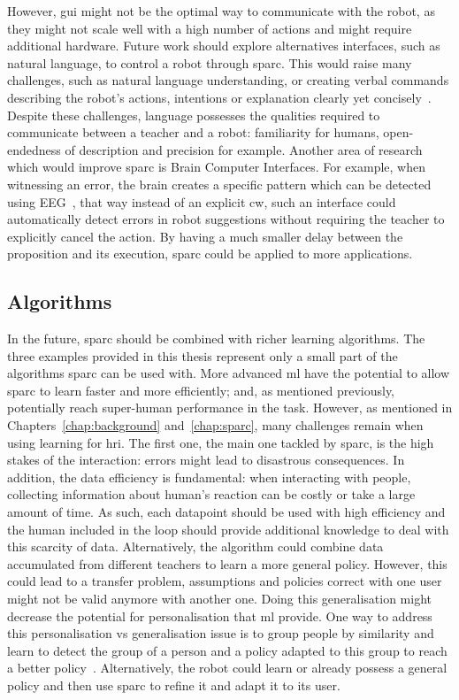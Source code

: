 However, \gls{gui} might not be the optimal way to communicate with the robot, as they might not scale well with a high number of actions and might require additional hardware. Future work should explore alternatives interfaces, such as natural language, to control a robot through \gls{sparc}. This would raise many challenges, such as natural language understanding, or creating verbal commands describing the robot's actions, intentions or explanation clearly yet concisely~\citep{hayes2017improving}. Despite these challenges, language possesses the qualities required to communicate between a teacher and a robot: familiarity for humans, open-endedness of description and precision for example. Another area of research which would improve \gls{sparc} is Brain Computer Interfaces. For example, when witnessing an error, the brain creates a specific pattern which can be detected using EEG~\citep{gehring1993neural}, that way instead of an explicit \gls{cw}, such an interface could automatically detect errors in robot suggestions without requiring the teacher to explicitly cancel the action. By having a much smaller delay between the proposition and its execution, \gls{sparc} could be applied to more applications.

\subsection{Algorithms}

In the future, \gls{sparc} should be combined with richer learning algorithms. The three examples provided in this thesis represent only a small part of the algorithms \gls{sparc} can be used with. More advanced \gls{ml} have the potential to allow \gls{sparc} to learn faster and more efficiently; and, as mentioned previously, potentially reach super-human performance in the task. However, as mentioned in Chapters~\ref{chap:background} and~\ref{chap:sparc}, many challenges remain when using learning for \gls{hri}. The first one, the main one tackled by \gls{sparc}, is the high stakes of the interaction: errors might lead to disastrous consequences. In addition, the data efficiency is fundamental: when interacting with people, collecting information about human's reaction can be costly or take a large amount of time. As such, each datapoint should be used with high efficiency and the human included in the loop should provide additional knowledge to deal with this scarcity of data. Alternatively, the algorithm could combine data accumulated from different teachers to learn a more general policy. However, this could lead to a transfer problem, assumptions and policies correct with one user might not be valid anymore with another one. Doing this generalisation might decrease the potential for personalisation that \gls{ml} provide. One way to address this personalisation vs generalisation issue is to group people by similarity and learn to detect the group of a person and a policy adapted to this group to reach a better policy~\citep{brunskill2014pac}. Alternatively, the robot could learn or already possess a general policy and then use \gls{sparc} to refine it and adapt it to its user. 

